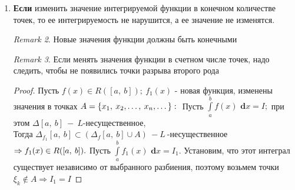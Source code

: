 \documentclass[a4paper,12pt]{bookest}
\newtheorem{theorem}{Theorem}[section]
\theoremstyle{remark}
\newtheorem*{remark}{Remark}
\newcommand\tab[1][1cm]{\hspace*{#1}}
\newcommand\dx{\textbf{ d}x}
\begin{document}
\begin{enumerate}
\begin{theorem}
		\begin{proof}
			$f(x)\in C([a,\>b])\Rightarrow m=\inf\limits_{x\in[a,\>b]}f(x)=\min\limits_{x\in[a,\>b]}f(x),$ причем $\\\exists x',\>x''\in[a,\>b]:\>f(x')=m,\>f(x'')=M.\\(10)\Rightarrow m(b-a)\leq\int\limits_{a}^{b}f(x)\dx\leq M(b-a)\tab|\>:(b-a)\\m\leq\frac1{b-a}\int\limits_{a}^{b}f(x)\dx\leq M.\\$ Непрерывная функция принимает все промежуточные на отрезке $[a,\>b]\Rightarrow\\\Rightarrow\exists\xi\in[a,\>b]:\>f(\xi)-\frac1{b-a}\int\limits_{a}^{b}f(x)\dx.$ $$\left(\frac1{b-a}\int\limits_{a}^{b}f(x)\dx\in[m,\>M]\right)\Rightarrow\int\limits_{a}^{b}f(x)\dx=f(\xi)(b-a)$$
		\end{proof}
		\begin{remark}$\\$
			Если $a<b$, то замечание аналогично предыдущему. Величина $\frac1{b-a}\int\limits_{a}^{b}f(x)\dx$ - среднее значение $f(x)$ на $[a,\>b].$
		\end{remark}
	\end{theorem}
	\item \textbf{Если} изменить значение интегрируемой функции в конечном количестве точек, то ее интегрируемость не нарушится, а ее значение не изменятся. \begin{remark}
		Новые значения функции должны быть конечными 
	\end{remark} \begin{remark}
		Если менять значения функции в счетном числе точек, надо следить, чтобы не появились точки разрыва второго рода	\end{remark} \begin{proof}
			Пусть $f(x)\in R([a,\>b]);\>f_1(x)$ - новая функция, изменены значения в точках $A=\{x_1,\>x_2,\dots,\>x_n,\dots\}:\\$ Пусть $\int\limits_{a}^{b}f(x)\dx=I;$ при этом $\Delta[a,\>b]\>-\>L$-несущественное,\\ Тогда $\Delta_{f_1}[a,\>b]\subset(\Delta_f[a,\>b]\cup A)\>-L\>$-несущественное $\Rightarrow f_1(x)\in R([a,\>b]).\\$ Пусть $\int\limits_{a}^{b}f_1(x)\dx=I_1.$ Установим, что этот интеграл существует независимо от выбранного разбиения, поэтому возьмем точки $\xi_k\not\in A\Rightarrow I_1=I$
		\end{proof} 			
\end{enumerate}
\end{document}
